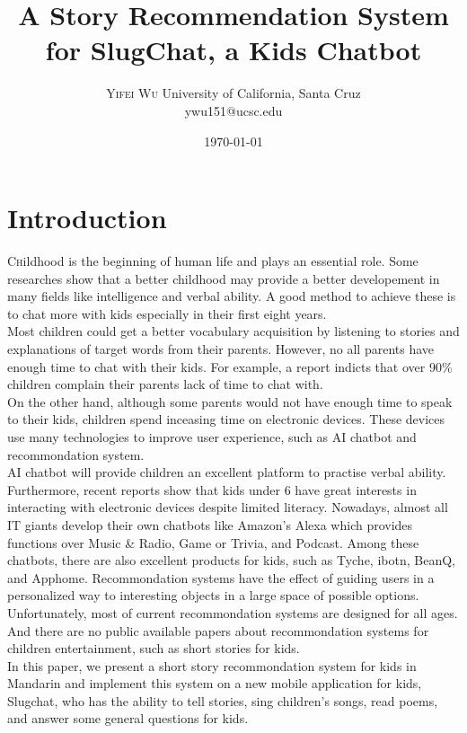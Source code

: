 \documentclass[twoside,twocolumn]{article}
\title{A Story Recommendation System for SlugChat, a Kids Chatbot} %
\author{%
\textsc{Yifei Wu}%
\normalsize University of California, Santa Cruz \\ %
\normalsize ywu151@ucsc.edu\\ %
}
\date{\today} %
\begin{document}
\maketitle


\section{Introduction}

\lettrine[nindent=0em,lines=3]{C}hildhood is the beginning of human life and plays an essential role. Some researches show that a better childhood may provide a better developement in many fields like intelligence and verbal ability. A good method to achieve these is to chat more with kids especially in their first eight years\cite{1,2}.
\\
Most children could get a better vocabulary acquisition by listening to stories and explanations of target words from their parents\cite{3}. However, no all parents have enough time to chat with their kids. For example, a report indicts that over 90\% children complain their parents lack of time to chat with\cite{4}.
\\
On the other hand, although some parents would not have enough time to speak to their kids, children spend inceasing time on electronic devices\cite{5}. These devices use many technologies to improve user experience, such as AI chatbot and recommondation system.
\\
AI chatbot will provide children an excellent platform to practise verbal ability. Furthermore, recent reports show that kids under 6 have great interests in interacting with electronic devices despite limited literacy\cite{6}. Nowadays, almost all IT giants develop their own chatbots like Amazon's Alexa which provides functions over Music \& Radio, Game or Trivia, and Podcast\cite{7}. Among these chatbots, there are also excellent products for kids, such as Tyche, ibotn, BeanQ, and Apphome\cite{8}.
Recommondation systems have the effect of guiding users in a personalized way to interesting objects in a large space of possible options\cite{9}.
\\
Unfortunately, most of current recommondation systems are designed for all ages. And there are no public available papers about recommondation systems for children entertainment, such as short stories for kids.
\\
In this paper, we present a short story recommondation system for kids in Mandarin and implement this system on a new mobile application for kids, Slugchat, who has the ability to tell stories, sing children's songs, read poems, and answer some general questions for kids.
\end{document}
